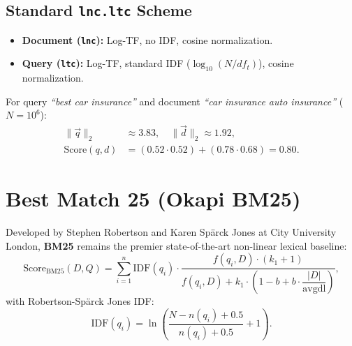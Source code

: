 \subsection{Standard \texttt{lnc.ltc} Scheme}
\begin{itemize}
    \item \textbf{Document (\texttt{lnc}):} Log-TF, no IDF, cosine normalization.
    \item \textbf{Query (\texttt{ltc}):} Log-TF, standard IDF ($\log_{10}(N/df_t)$), cosine normalization.
\end{itemize}

For query \textit{``best car insurance''} and document \textit{``car insurance auto insurance''} ($N = 10^6$):
\begin{align*}
\|\vec{q}\|_2 &\approx 3.83, \quad \|\vec{d}\|_2 \approx 1.92, \\
\text{Score}(q, d) &= (0.52 \cdot 0.52) + (0.78 \cdot 0.68) = \mathbf{0.80}.
\end{align*}

\FloatBarrier
\section{Best Match 25 (Okapi BM25)}
\label{sec:bm25-deep-en}

Developed by Stephen Robertson and Karen Sp\"arck Jones at City University London, \textbf{BM25} remains the premier state-of-the-art non-linear lexical baseline:
\begin{equation}
\text{Score}_{\text{BM25}}(D, Q) = \sum_{i=1}^{n} \text{IDF}(q_i) \cdot \frac{f(q_i, D) \cdot (k_1 + 1)}{f(q_i, D) + k_1 \cdot \left(1 - b + b \cdot \dfrac{|D|}{\text{avgdl}}\right)},
\end{equation}
with Robertson-Sp\"arck Jones IDF:
\begin{equation}
\text{IDF}(q_i) = \ln\left( \frac{N - n(q_i) + 0.5}{n(q_i) + 0.5} + 1 \right).
\end{equation}

